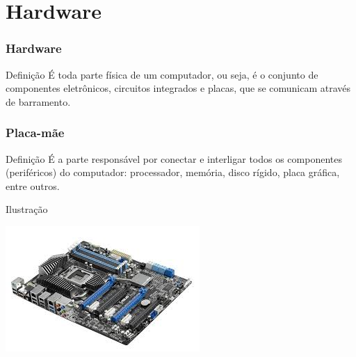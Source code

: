 \documentclass[aspectratio=169]{beamer} %
\begin{document}
\section{Hardware}

\begin{frame}
	\frametitle{Hardware}
	
	\begin{block}{Defini\c cão}
		É toda parte física de um computador, ou seja, é o conjunto de componentes eletrônicos, circuitos integrados e placas, que se comunicam através de barramento.
	\end{block}
\end{frame}

\begin{frame}
	\frametitle{Placa-mãe}
	
	\begin{block}{Defini\c cão}
		É a parte responsável por conectar e interligar todos os componentes (periféricos) do computador: processador, memória, disco rígido, placa gráfica, entre outros.
	\end{block}\vfill
	
	\begin{exampleblock}{Ilustra\c cão}
		\begin{center}
			\includegraphics[scale=0.4]{img/placa-mae}
		\end{center}			
	\end{exampleblock}
\end{frame}
\end{document}
